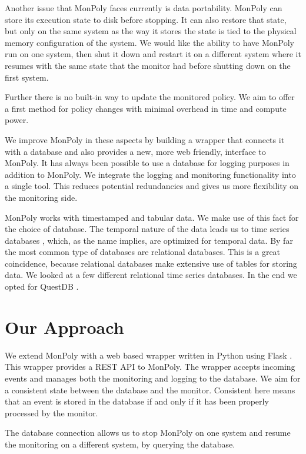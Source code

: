 Another issue that MonPoly faces currently is data portability.
MonPoly can store its execution state to disk before stopping.
It can also restore that state, but only on the same system as the way it stores the state is tied to the physical memory configuration of the system.
We would like the ability to have MonPoly run on one system, then shut it down and restart it on a different system where it resumes with the same state that the monitor had before shutting down on the first system.

Further there is no built-in way to update the monitored policy.
We aim to offer a first method for policy changes with minimal overhead in time and compute power.

We improve MonPoly in these aspects by building a wrapper that connects it with a database and also provides a new, more web friendly, interface to MonPoly.
It has always been possible to use a database for logging purposes in addition to MonPoly.
We integrate the logging and monitoring functionality into a single tool.
This reduces potential redundancies and gives us more flexibility on the monitoring side.

MonPoly works with timestamped and tabular data.
We make use of this fact for the choice of database.
The temporal nature of the data leads us to time series databases \cite{}, which, as the name implies, are optimized for temporal data.
By far the most common type of databases are relational databases.
This is a great coincidence, because relational databases make extensive use of tables for storing data.
We looked at a few different relational time series databases.
In the end we opted for QuestDB \cite{questdb}.

\section{Our Approach}
We extend MonPoly with a web based wrapper written in Python using Flask \cite{Flask}.
This wrapper provides a REST API \cite{Fielding2000} to MonPoly.
The wrapper accepts incoming events and manages both the monitoring and logging to the database.
We aim for a consistent state between the database and the monitor.
Consistent here means that an event is stored in the database if and only if it has been properly processed by the monitor.

The database connection allows us to stop MonPoly on one system and resume the monitoring on a different system, by querying the database.

